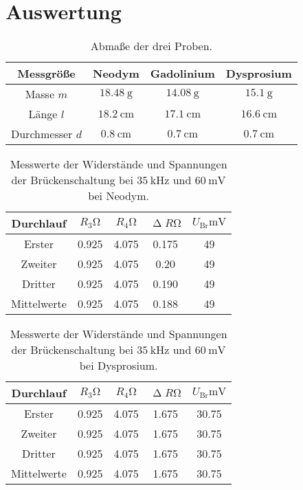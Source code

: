 \section{Auswertung}
\label{sec:Auswertung}

\begin{table}[H]
  \centering
  \caption{Abmaße der drei Proben.}
  \label{tab:abmProben}
  \begin{tabular}{c c c c}
    \toprule
    Messgröße & Neodym & Gadolinium & Dysprosium \\
    \midrule
    Masse $m$ & $\SI{18.48}{\gram}$ & $\SI{14.08}{\gram}$ & $\SI{15.1}{\gram}$ \\
    Länge $l$ & $\SI{18.2}{\centi\meter}$ & $\SI{17.1}{\centi\meter}$ & $\SI{16.6}{\centi\meter}$ \\ %
    Durchmesser $d$ & $\SI{0.8}{\centi\meter}$ & $\SI{0.7}{\centi\meter}$ & $\SI{0.7}{\centi\meter}$ \\
    \bottomrule
  \end{tabular}
\end{table}


\begin{table}[H]
  \centering
  \caption{Messwerte der Widerstände und Spannungen der Brückenschaltung bei $\SI{35}{\kilo\hertz}$ und $\SI{60}{\milli\volt}$ bei Neodym.}
  \label{tab:abmProben}
  \begin{tabular}{c| c c c c}
    \toprule
    Durchlauf & $R_3 \si{\ohm}$ & $R_4 \si{\ohm}$ & $\upDelta R \si{\ohm}$ & $U_{\text{Br}} \si{\milli\volt}$ \\%
    \midrule
    Erster & 0.925 & 4.075 & 0.175 & 49 \\
    Zweiter & 0.925 & 4.075 & 0.20 & 49 \\
    Dritter & 0.925 & 4.075 & 0.190 & 49 \\
    Mittelwerte & 0.925 & 4.075 & 0.188 & 49\\
    \bottomrule
  \end{tabular}
\end{table}

\begin{table}[H]
  \centering
  \caption{Messwerte der Widerstände und Spannungen der Brückenschaltung bei $\SI{35}{\kilo\hertz}$ und $\SI{60}{\milli\volt}$ bei Dysprosium.}
  \label{tab:abmProben}
  \begin{tabular}{c| c c c c}
    \toprule
    Durchlauf & $R_3 \si{\ohm}$ & $R_4 \si{\ohm}$ & $\upDelta R \si{\ohm}$ & $U_{\text{Br}} \si{\milli\volt}$ \\
    \midrule
    Erster & 0.925 & 4.075 & 1.675 & 30.75 \\
    Zweiter & 0.925 & 4.075 & 1.675 & 30.75 \\
    Dritter & 0.925 & 4.075 & 1.675 & 30.75 \\
    Mittelwerte & 0.925 & 4.075 & 1.675 & 30.75 \\
    \bottomrule
  \end{tabular}
\end{table}

